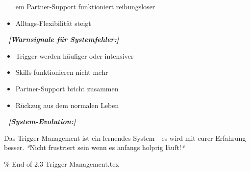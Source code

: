 \begin{itemize}
em   Partner-Support funktioniert reibungsloser
\item   Alltags-Flexibilität steigt
\end{itemize}

\textbf{🚨 \textit{[Warnsignale für Systemfehler:]}}

\begin{itemize}
\item   Trigger werden häufiger oder intensiver
\item   Skills funktionieren nicht mehr
\item   Partner-Support bricht zusammen
\item   Rückzug aus dem normalen Leben
\end{itemize}

\textbf{🔄 \textit{[System-Evolution:]}}

Das \textcolor{ctmmRed}{Trigger}-Management ist ein lernendes System - es wird mit eurer
Erfahrung besser. \textit{*}Nicht frustriert sein wenn es anfangs holprig
läuft!\textit{*}

\% End of 2.3 Trigger Management.tex
